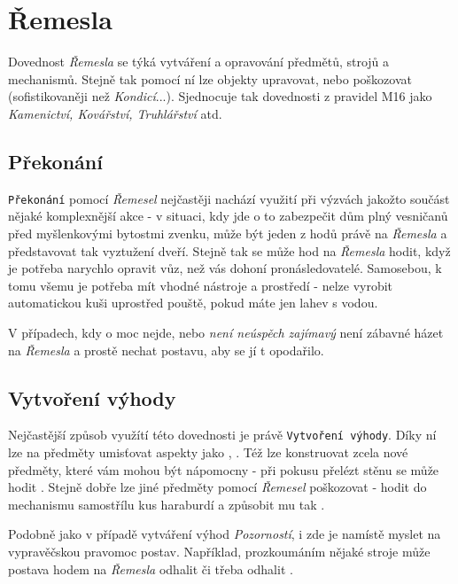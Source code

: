 \documentclass[../main.tex]{subfiles}
\begin{document}
\section{Řemesla}
\label{sec:remesla}

Dovednost \textit{Řemesla} se týká vytváření a opravování předmětů, strojů a mechanismů. Stejně tak pomocí ní lze objekty upravovat, nebo poškozovat (sofistikovaněji než \textit{Kondicí}...). Sjednocuje tak dovednosti z pravidel M16 jako \textit{Kamenictví, Kovářství, Truhlářství} atd.

\subsection*{Překonání}
\label{subsec:remesla-prekonani}
\prekonani

\texttt{Překonání} pomocí \textit{Řemesel} nejčastěji nachází využití při výzvách jakožto součást nějaké komplexnější akce - v situaci, kdy jde o to zabezpečit dům plný vesničanů před myšlenkovými bytostmi zvenku, může být jeden z hodů právě na \textit{Řemesla} a představovat tak vyztužení dveří. Stejně tak se může hod na \textit{Řemesla} hodit, když je potřeba narychlo opravit vůz, než vás dohoní pronásledovatelé. Samosebou, k tomu všemu je potřeba mít vhodné nástroje a prostředí - nelze vyrobit automatickou kuši uprostřed pouště, pokud máte jen lahev s vodou.

V případech, kdy o moc nejde, nebo \textit{není neúspěch zajímavý} není zábavné házet na \textit{Řemesla} a prostě nechat postavu, aby se jí t opodařilo.

\subsection*{Vytvoření výhody}
\label{subsec:remesla-vytvoreni}
\vytvoreni

Nejčastější způsob využítí této dovednosti je právě \texttt{Vytvoření výhody}. Díky ní lze na předměty umisťovat aspekty jako , . Též lze konstruovat zcela nové předměty, které vám mohou být nápomocny - při pokusu přelézt stěnu se může hodit . Stejně dobře lze jiné předměty pomocí \textit{Řemesel} poškozovat - hodit do mechanismu samostřílu kus haraburdí a způsobit mu tak .

Podobně jako v případě vytváření výhod \textit{Pozorností}, i zde je namístě myslet na vypravěčskou pravomoc postav. Například, prozkoumáním nějaké stroje může postava hodem na \textit{Řemesla} odhalit  či třeba odhalit .
\end{document}
